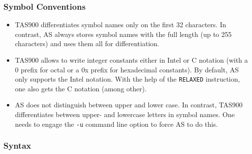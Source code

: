 \documentclass[12pt,twoside]{report}
\newcommand{\tty}[1]{{\tt #1}}
\newcommand{\asname}{{AS}}
\begin{document}
\subsubsection{Symbol Conventions}

\begin{itemize}
\item{TAS900 differentiates symbol names only on the first 32
      characters.  In contrast, \asname{} always stores symbol names with the
      full length (up to 255 characters) and uses them all for
      differentiation.}
\item{TAS900 allows to write integer constants either in Intel or C
      notation (with a 0 prefix for octal or a 0x prefix for hexadecimal
      constants).  By default, \asname{} only supports the Intel notation.
      With the help of the \tty{RELAXED} instruction, one also gets the C
      notation (among other).}
\item{\asname{} does not distinguish between upper and lower case.  In
      contrast, TAS900 differentiates between upper- and lowercase
      letters in symbol names.  One needs to engage the \tty{-u} command
      line option to force \asname{} to do this.}
\end{itemize}

\subsubsection{Syntax}
\end{document}
